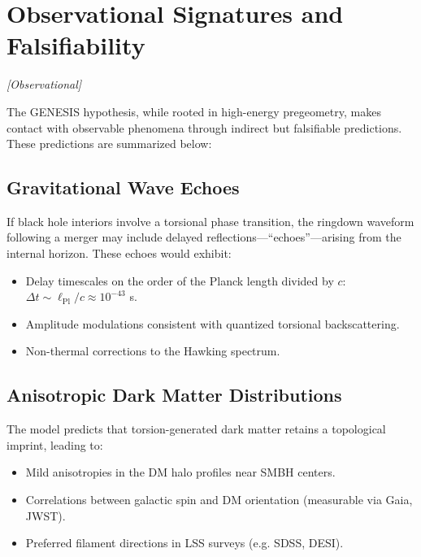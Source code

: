 \documentclass{article}
\newcommand{\obstag}{\textcolor{green!60!black}{\textit{[Observational]}}}
\begin{document}
\section{Observational Signatures and Falsifiability} 
\label{sec:observables} 
\obstag

The GENESIS hypothesis, while rooted in high-energy pregeometry, makes contact with observable phenomena through indirect but falsifiable predictions. These predictions are summarized below:

\subsection{Gravitational Wave Echoes} If black hole interiors involve a torsional phase transition, the ringdown waveform following a merger may include delayed reflections---``echoes''---arising from the internal horizon. These echoes would exhibit: \begin{itemize} \item Delay timescales on the order of the Planck length divided by $c$: $\Delta t \sim \ell_{\text{Pl}}/c \approx 10^{-43}$ s. \item Amplitude modulations consistent with quantized torsional backscattering. \item Non-thermal corrections to the Hawking spectrum. \end{itemize}

\medskip
\begin{center}
\end{center}
\medskip


\subsection{Anisotropic Dark Matter Distributions} The model predicts that torsion-generated dark matter retains a topological imprint, leading to: \begin{itemize} \item Mild anisotropies in the DM halo profiles near SMBH centers. \item Correlations between galactic spin and DM orientation (measurable via Gaia, JWST). \item Preferred filament directions in LSS surveys (e.g. SDSS, DESI). \end{itemize}
\end{document}
